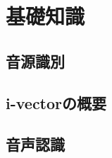 \chapter{基礎知識}

\section{音源識別}
\label{section:devide_audio}


\section{i-vectorの概要}


\section{音声認識}

